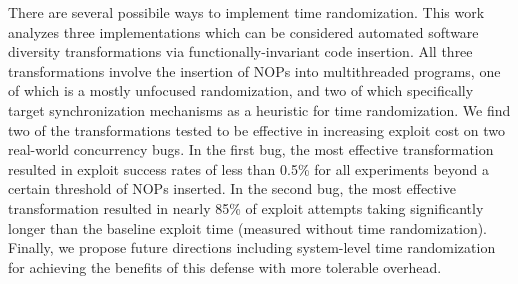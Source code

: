 There are several possibile ways to implement time randomization.
This work analyzes three implementations which can be considered automated software diversity transformations via functionally-invariant code insertion.
All three transformations involve the insertion of NOPs into multithreaded programs, one of which is a mostly unfocused randomization, and two of which specifically target synchronization mechanisms as a heuristic for time randomization.
We find two of the transformations tested to be effective in increasing exploit cost on two real-world concurrency bugs.
In the first bug, the most effective transformation resulted in exploit success rates of less than 0.5\% for all experiments beyond a certain threshold of NOPs inserted.
In the second bug, the most effective transformation resulted in nearly 85\% of exploit attempts taking significantly longer than the baseline exploit time (measured without time randomization).
Finally, we propose future directions including system-level time randomization for achieving the benefits of this defense with more tolerable overhead.
